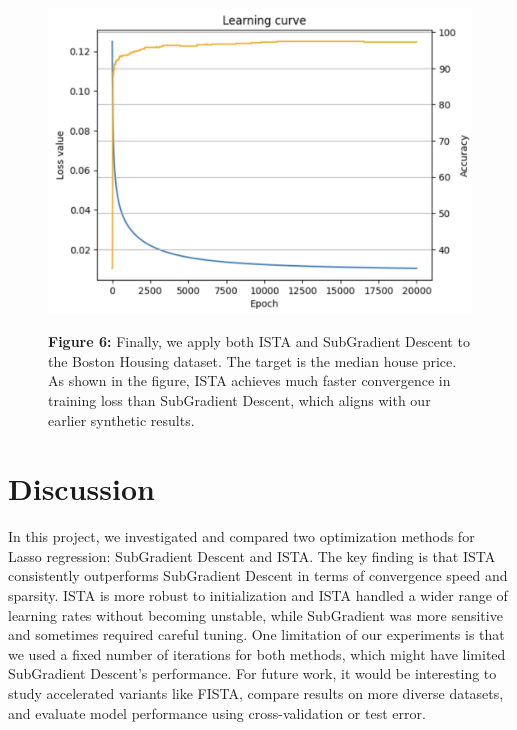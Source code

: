 \documentclass[11pt]{article}
\begin{document}
\begin{figure}[H]
    \centering
    \begin{minipage}{0.3\textwidth}
        \includegraphics[width=\linewidth]{figures/fig1.png}
    \end{minipage}
    \hfill
    \begin{minipage}{0.5\textwidth}
        \small
        \textbf{Figure 6:}
        Finally, we apply both ISTA and SubGradient Descent to the Boston Housing dataset. The
        target is the median house price.
        As shown in the figure, ISTA achieves much faster convergence in training loss than SubGradient Descent, which aligns with our earlier synthetic results.

    \end{minipage}
\end{figure}


\section{Discussion}

In this project, we investigated and compared two optimization methods for Lasso regression: SubGradient Descent and ISTA.
The key finding is that ISTA consistently outperforms SubGradient Descent in terms of convergence speed and sparsity.
ISTA is more robust to initialization and ISTA handled a wider range of learning rates without becoming unstable, while SubGradient was more sensitive and sometimes required careful tuning.
One limitation of our experiments is that we used a fixed number of iterations for both methods, which might have limited SubGradient Descent’s performance.
For future work, it would be interesting to study accelerated variants like FISTA, compare results on more diverse datasets, and evaluate model performance using cross-validation or test error.
\end{document}

